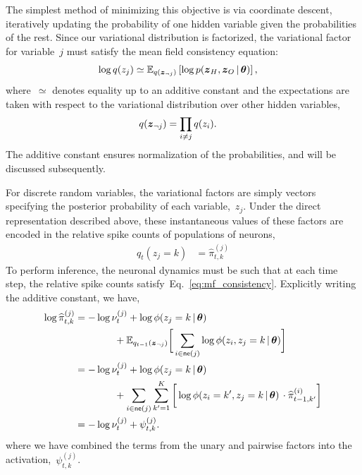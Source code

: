 The simplest method of minimizing this objective is via coordinate
descent, iteratively updating the probability of one hidden variable
given the probabilities of the rest. Since our variational
distribution is factorized, the variational factor for variable~$j$
must satisfy the mean field consistency equation:
\begin{align}
  \label{eq:mf_consistency}
  \log q(z_j) &\simeq \mathbb{E}_{q(\boldsymbol{z}_{\neg j})}
  \left[ \log p(\boldsymbol{z}_H, \boldsymbol{z}_O \,|\, \boldsymbol{\theta}) \right],
\end{align}
where~$\simeq$ denotes equality up to an additive constant and the
expectations are taken with respect to the variational
distribution over other hidden variables,
\begin{align}
  q(\boldsymbol{z}_{\neg j}) &= \prod_{i \neq j} q(z_{i}).
\end{align}
The additive constant
ensures normalization of the probabilities, and will be discussed
subsequently.  

For discrete random variables, the variational factors are simply
vectors specifying the posterior probability of each variable,~$z_j$.
Under the direct representation described above, these instantaneous
values of these factors are encoded in the relative spike counts of
populations of neurons,
\begin{align}
  q_t(z_j=k) &= \widehat{\pi}_{t,k}^{(j)} 
\end{align}
To perform inference, the neuronal dynamics must be such that at each
time step, the relative spike counts satisfy~Eq.~\ref{eq:mf_consistency}. 
Explicitly writing the additive constant, we have,
\begin{align}
  \nonumber
  \log \widehat{\pi}_{t,k}^{(j)} 
  &= -\log \nu_t^{(j)} + \log \phi(z_j=k \,|\, \boldsymbol{\theta}) \\
  &\hspace{4em} + \mathbb{E}_{q_{t-1}(\boldsymbol{z}_{\neg j})} \bigg[
  \sum_{i \in \mathsf{ne}(j)} \log \phi(z_{i}, z_j=k \,|\, \boldsymbol{\theta}) \bigg] \\
  & \nonumber = 
     - \log \nu_t^{(j)} + \log \phi(z_j=k \,|\, \boldsymbol{\theta}) \\
  & \label{eq:variational_rate}
  \hspace{4em} + \sum_{i \in \mathsf{ne}(j)} \sum_{k'=1}^K
  \bigg[\log \phi(z_{i}=k', z_j=k \,|\, \boldsymbol{\theta}) \,\cdot  \widehat{\pi}_{t-1,k'}^{(i)} \bigg] \\
  &= -\log \nu_t^{(j)} + \psi_{t,k}^{(j)}.
\end{align}
where we have combined the terms from the unary and pairwise factors
into the activation,~$\psi_{t,k}^{(j)}$.

